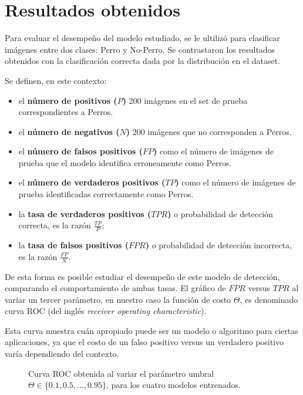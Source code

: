 \documentclass[12pt]{article}
\begin{document}
\section{Resultados obtenidos}

Para evaluar el desempeño del modelo estudiado, se le ultilizó para clasificar imágenes entre dos clases:
Perro y No-Perro. Se contrastaron los resultados obtenidos con la clasificación correcta dada por la distribución en el dataset.

Se definen, en este contexto: 

\begin{itemize}
    \item el \textbf{número de positivos ($P$)} 200 imágenes en el set de prueba correspondientes a Perros.
    \item el \textbf{número de negativos ($N$)} 200 imágenes que no corresponden a Perros.
    \item el \textbf{número de falsos positivos ($FP$)} como el número de
        imágenes de prueba que el modelo identifica erroneamente como Perros.
    \item el \textbf{número de verdaderos positivos ($TP$)} como el número de
        imágenes de prueba identificadas correctamente como Perros.
    \item la \textbf{tasa de verdaderos positivos ($TPR$)} o probabilidad de detección correcta, es la razón $\frac{TP}{P}$;
    \item la \textbf{tasa de falsos positivos ($FPR$)} o probabilidad de detección incorrecta, es la razón $\frac{FP}{N}$.
\end{itemize}

De esta forma es posible estudiar el desempeño de este modelo de detección, comparando el comportamiento de ambas tasas.
El gráfico de $FPR$ versus $TPR$ al variar un tercer parámetro, en nuestro caso la función de costo $\Theta$, es denominado curva
ROC (del inglés \emph{receiver operating characteristic}).

Esta curva muestra
cuán apropiado puede ser un modelo o algoritmo para ciertas aplicaciones, ya que
el costo de un falso positivo versus un verdadero positivo varía dependiendo del
contexto.

\begin{figure}[h]
    \centering

    \caption{Curva ROC obtenida al variar el parámetro umbral $\Theta \in \{ 0.1,0.5,...,0.95\}$, para los cuatro modelos entrenados.}
\end{figure}
\end{document}
